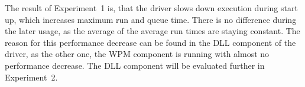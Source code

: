 \medskip

The result of Experiment~1 is, that the driver slows down execution during start up, which increases maximum run and queue time. There is no difference during the later usage, as the average of the average run times are staying constant. The reason for this performance decrease can be found in the \gls{DLL} component of the driver, as the other one, the \gls{WPM} component is running with almost no performance decrease. The \gls{DLL} component will be evaluated further in Experiment~2.